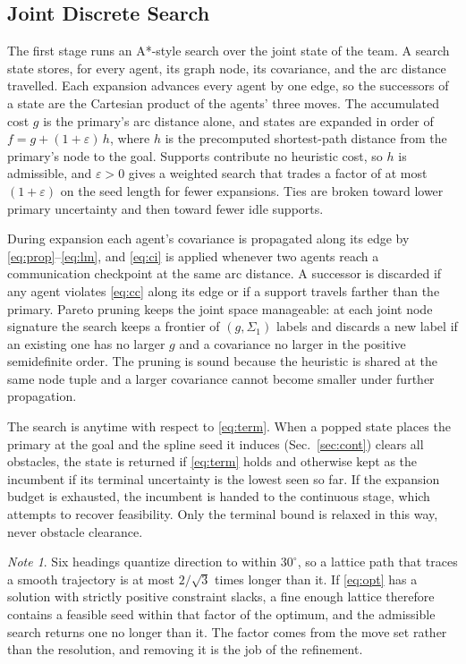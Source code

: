 \documentclass[letterpaper, 10 pt, conference]{ieeeconf}
\theoremstyle{remark}
\newtheorem*{note}{Note}
\begin{document}
\subsection{Joint Discrete Search}

The first stage runs an A*-style search \cite{hart1968astar} over the joint
state of the team. A search state stores, for every agent, its graph node,
its covariance, and the arc distance travelled. Each expansion advances
every agent by one edge, so the successors of a state are the Cartesian
product of the agents' three moves. The accumulated cost $g$ is the
primary's arc distance alone, and states are expanded in order of
$f = g + (1+\varepsilon)\,h$, where $h$ is the precomputed shortest-path
distance from the primary's node to the goal. Supports contribute no
heuristic cost, so $h$ is admissible, and $\varepsilon > 0$ gives a weighted
search \cite{pohl1970weighted} that trades a factor of at most
$(1+\varepsilon)$ on the seed length \cite{pearl1984heuristics} for fewer
expansions. Ties are broken toward lower primary
uncertainty and then toward fewer idle supports.

During expansion each agent's covariance is propagated along its edge by
\eqref{eq:prop}--\eqref{eq:lm}, and \eqref{eq:ci} is applied whenever two
agents reach a communication checkpoint at the same arc distance. A
successor is discarded if any agent violates \eqref{eq:cc} along its edge or
if a support travels farther than the primary. Pareto pruning keeps the
joint space manageable: at each joint node signature the search keeps a
frontier of $(g, \Sigma_1)$ labels and discards a new label if an existing
one has no larger $g$ and a covariance no larger in the positive
semidefinite order. The pruning is sound because the heuristic is shared at
the same node tuple and a larger covariance cannot become smaller under
further propagation.

The search is anytime with respect to \eqref{eq:term}. When a popped state
places the primary at the goal and the spline seed it induces
(Sec.~\ref{sec:cont}) clears all obstacles, the state is returned if
\eqref{eq:term} holds and otherwise kept as the incumbent if its terminal
uncertainty is the lowest seen so far. If the expansion budget is exhausted,
the incumbent is handed to the continuous stage, which attempts to recover
feasibility. Only the terminal bound is relaxed in this way, never obstacle
clearance.

\begin{note}
Six headings quantize direction to within $30^\circ$, so a lattice path that
traces a smooth trajectory is at most $2/\sqrt{3}$ times longer than it. If
\eqref{eq:opt} has a solution with strictly positive constraint slacks, a
fine enough lattice therefore contains a feasible seed within that factor of
the optimum, and the admissible search returns one no longer than it. The
factor comes from the move set rather than the resolution, and removing it
is the job of the refinement.
\end{note}
\end{document}
